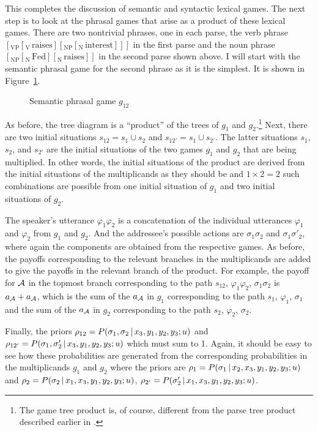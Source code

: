 This completes the discussion of semantic and syntactic lexical games. The next step is to look at the  phrasal games that arise as a product of these lexical games. There are two nontrivial phrases, one in each parse, the verb phrase $[_{\mathrm{VP}}[_{\mathrm{V}}\,\mathrm{raises}][_{\mathrm{NP}}[_{\mathrm{N}}\,\mathrm{interest}]]]$ in the first parse and the noun phrase $[_{\mathrm{NP}}[_{\mathrm{N}}\,\mathrm{Fed}]\allowbreak[_{\mathrm{N}}\,\mathrm{raises}]]$ in the second parse shown above. I will start with the semantic phrasal game for the second phrase as it is the simplest. It is shown in Figure~\ref{fig:semantic phrasal game g12}.

\begin{figure}[h] 

\caption{Semantic phrasal game $g_{12}$}
\label{fig:semantic phrasal game g12}
\end{figure}

As before, the tree diagram is a ``product'' of the trees of $g_1$ and $g_2$.\footnote{The game tree product is, of course, different from the parse tree product described earlier in .} Next, there are two initial situations $s_{12} = s_1 \cup s_2$ and $s_{12'} = s_1 \cup s_{2'}$. The latter situations $s_1$, $s_2$, and $s_{2'}$ are the initial situations of the two games $g_1$ and $g_2$ that are being multiplied. In other words, the initial situations of the product are derived from the initial situations of the multiplicands as they should be and $1 \times 2 = 2$ such combinations are possible from one initial situation of $g_1$ and two initial situations of $g_2$. 

The speaker's utterance $\varphi_1\varphi_2$ is a concatenation of the individual utterances $\varphi_1$ and $\varphi_2$ from $g_1$ and $g_2$. And the addressee's possible actions are $\sigma_1\sigma_2$ and $\sigma_1\sigma'_2$, where again the components are obtained from the respective games. As before, the payoffs corresponding to the relevant branches in the multiplicands are added to give the payoffs in the relevant branch of the product. For example, the payoff for $\cal A$ in the topmost branch corresponding to the path $s_{12}$, $\varphi_1\varphi_2$, $\sigma_1\sigma_2$ is $a_{\cal A} + a_{\cal A}$, which is the sum of the $a_{\cal A}$ in $g_1$ corresponding to the path $s_1$, $\varphi_1$, $\sigma_1$ and the sum of the $a_{\cal A}$ in $g_2$ corresponding to the path $s_2$, $\varphi_2$, $\sigma_2$.

Finally, the priors $\rho_{12} = P(\sigma_1, \sigma_2 \,|\, x_3, y_1, y_ 2, y_3; u)$ and $\rho_{12'} = P(\sigma_1, \sigma'_2 \,|\, x_3, y_1,\allowbreak y_2, y_3; u)$ which must sum to 1. Again, it should be easy to see how these probabilities are generated from the corresponding probabilities in the multiplicands $g_1$ and $g_2$ where the priors are $\rho_1 = P(\sigma_1 \,|\, x_2, x_3, y_1, y_2, y_3; u)$ and $\rho_2 = P(\sigma_2 \,|\, x_1, x_3,\allowbreak y_1, y_2, y_3; u)$, $\rho_{2'} = P(\sigma'_2 \,|\, x_1, x_3, y_1, y_2, y_3; u)$.

